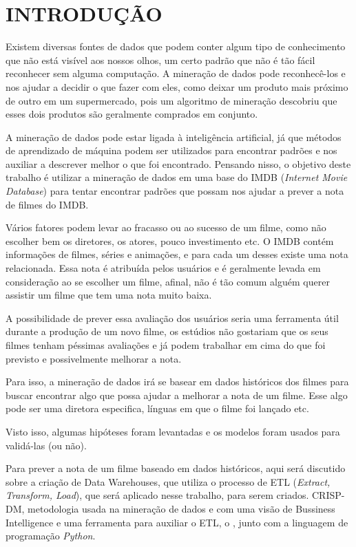 \section{INTRODUÇÃO}

Existem diversas fontes de dados que podem conter algum tipo de conhecimento que não está visível aos nossos olhos, um certo padrão que não é tão fácil reconhecer sem alguma computação. A mineração de dados pode reconhecê-los e nos ajudar a decidir o que fazer com eles, como deixar um produto mais próximo de outro em um supermercado, pois um algoritmo de mineração descobriu que esses dois produtos são geralmente comprados em conjunto.

A mineração de dados pode estar ligada à inteligência artificial, já que métodos de aprendizado de máquina podem ser utilizados para encontrar padrões e nos auxiliar a descrever melhor o que foi encontrado.
Pensando nisso, o objetivo deste trabalho é utilizar a mineração de dados em uma base do IMDB (\textit{Internet Movie Database}) para tentar encontrar padrões que possam nos ajudar a prever a nota de filmes do IMDB.

Vários fatores podem levar ao fracasso ou ao sucesso de um filme, como não escolher bem os diretores, os atores, pouco investimento etc. O IMDB contém informações de filmes, séries e animações, e para cada um desses existe uma nota relacionada. Essa nota é atribuída pelos usuários e é geralmente levada em consideração ao se escolher um filme, afinal, não é tão comum alguém querer assistir um filme que tem uma nota muito baixa.

A possibilidade de prever essa avaliação dos usuários seria uma ferramenta útil durante a produção de um novo filme, os estúdios não gostariam que os seus filmes tenham péssimas avaliações e já podem trabalhar em cima do que foi previsto e possivelmente melhorar a nota.

Para isso, a mineração de dados irá se basear em dados históricos dos filmes para buscar encontrar algo que possa ajudar a melhorar a nota de um filme. Esse algo pode ser uma diretora especifica, línguas em que o filme foi lançado etc.

Visto isso, algumas hipóteses foram levantadas e os modelos foram usados para validá-las (ou não).

Para prever a nota de um filme baseado em dados históricos, aqui será discutido sobre a criação de Data Warehouses, que utiliza o processo de ETL (\textit{Extract, Transform, Load}), que será aplicado nesse trabalho, para serem criados. CRISP-DM, metodologia usada na mineração de dados e com uma visão de Bussiness Intelligence e uma ferramenta para auxiliar o ETL, o \pdi, junto com a linguagem de programação \textit{Python}.

